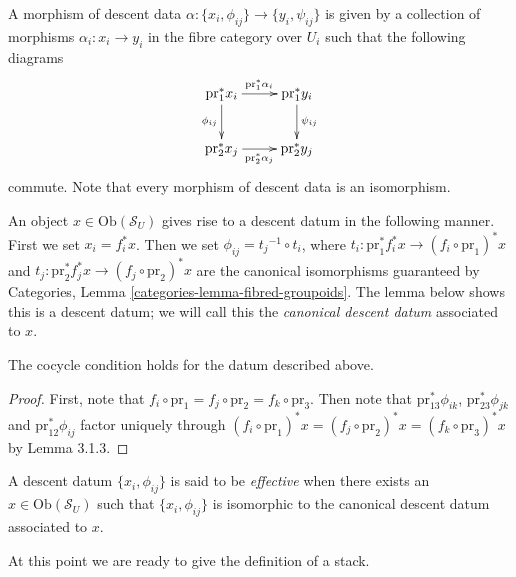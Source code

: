 \noindent
A morphism of descent data 
$\alpha : \{x_i, \phi_{ij}\} \rightarrow \{y_i, \psi_{ij}\}$ is given by a 
collection of morphisms $\alpha_i : x_i \to y_i$ in the fibre category
over $U_i$ such that the following diagrams
$$
\xymatrix{
\text{pr}_1^\ast x_i
	\ar[r]^{\text{pr}_1^\ast \alpha_i}
	\ar[d]_{\phi_{ij}}
&
\text{pr}_1^\ast y_i
	\ar[d]^{\psi_{ij}}
\\
\text{pr}_2^\ast x_j
	\ar[r]_{\text{pr}_2^\ast \alpha_j}
&
\text{pr}_2^\ast y_j
}
$$
commute. Note that every morphism of descent data is an isomorphism.

\medskip\noindent
An object $x \in \text{Ob}(\mathcal{S}_U)$ gives rise to a descent
datum in the following manner. First we set $x_i = f_i^\ast x$.
Then we set $\phi_{ij} = {t_{j}}^{-1} \circ t_{i}$, where 
$t_{i}: \text{pr}_1^\ast f_i^\ast x \to (f_i \circ \text{pr}_1)^\ast x$
and $t_{j}: \text{pr}_2^\ast f_j^\ast x \to (f_j \circ \text{pr}_2)^\ast x$ 
are the canonical isomorphisms guaranteed by Categories, 
Lemma \ref{categories-lemma-fibred-groupoids}.
The lemma below shows this is a descent datum; we will call
this the {\it canonical descent datum} associated to $x$.

\begin{lemma}
\label{lemma-trivial-cocycle}
The cocycle condition holds for the datum described above.
\end{lemma}

\begin{proof}
First, note that $f_i \circ\text{pr}_1 = f_j \circ \text{pr}_2=
f_k\circ \text{pr}_3$. Then note that $\text{pr}_{13}^\ast \phi_{ik}$,
$\text{pr}_{23}^\ast \phi_{jk}$ and $\text{pr}_{12}^\ast \phi_{ij}$ factor
uniquely through $(f_i\circ\text{pr}_1)^\ast x = 
(f_j \circ\text{pr}_2)^\ast x = (f_k \circ\text{pr}_3)^\ast x$
by Lemma 3.1.3.
\end{proof}

\begin{definition}
\label{definition-effective-descent-datum}
A descent datum $\{x_i,\phi_{ij}\}$ is said to be {\it effective}
when there exists an $x\in \text{Ob}(\mathcal{S}_U)$ 
such that $\{x_i,\phi_{ij}\}$ is isomorphic to the
canonical descent datum associated to $x$.
\end{definition}

\noindent
At this point we are ready to give the definition of a
stack. 

